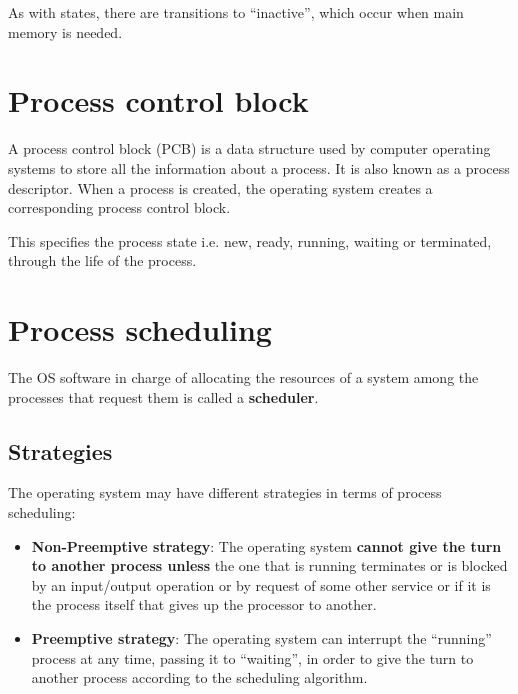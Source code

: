 As with states, there are transitions to “inactive”, which occur when main memory is needed.

\section{Process control block}

A process control block (PCB) is a data structure used by computer operating systems to store all the information about a process. It is also known as a process descriptor. When a process is created, the operating system creates a corresponding process control block.

This specifies the process state i.e. new, ready, running, waiting or terminated, through the life of the process.



\section{Process scheduling}

The OS software in charge of allocating the resources of a system among the processes that request them is called a \textbf{scheduler}.


\subsection{Strategies}
The operating system may have different strategies in terms of process scheduling:

\begin{itemize}
    \item \textbf{Non-Preemptive strategy}: The operating system \textbf{cannot give the turn to another process unless} the one that is running terminates or is blocked by an input/output operation or by request of some other service or if it is the process itself that gives up the processor to another.

    \item \textbf{Preemptive strategy}: The operating system can interrupt the “running” process at any time, passing it to “waiting”, in order to give the turn to another process according to the scheduling algorithm.
\end{itemize}

